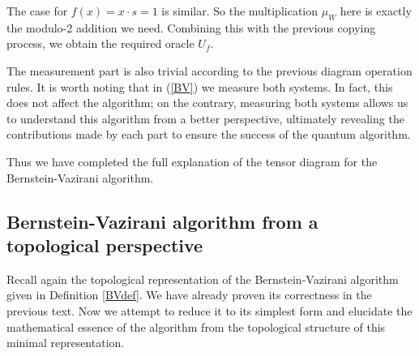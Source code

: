 \documentclass[a4paper,twocolumn,11pt,unpublished]{quantumarticle}
\numberwithin{equation}{section}
\begin{document}

The case for $f(x) = x \cdot s =1$ is similar. So the multiplication $\mu_{W}$ here is exactly the modulo-2 addition we need. Combining this with the previous copying process, we obtain the required oracle $U_{f}$.

The measurement part is also trivial according to the previous diagram operation rules. It is worth noting that in (\ref{BV}) we measure both systems. In fact, this does not affect the algorithm; on the contrary, measuring both systems allows us to understand this algorithm from a better perspective, ultimately revealing the contributions made by each part to ensure the success of the quantum algorithm.

Thus we have completed the full explanation of the tensor diagram for the Bernstein-Vazirani algorithm.

\subsection{Bernstein-Vazirani algorithm from a topological perspective}
Recall again the topological representation of the Bernstein-Vazirani algorithm given in Definition \ref{BVdef}. We have already proven its correctness in the previous text. Now we attempt to reduce it to its simplest form and elucidate the mathematical essence of the algorithm from the topological structure of this minimal representation.
\end{document}
